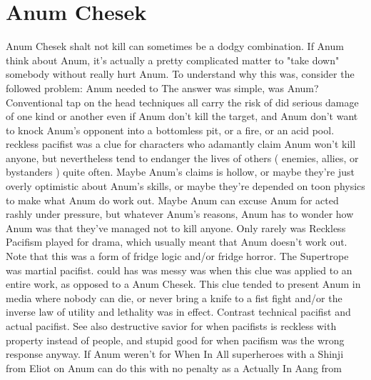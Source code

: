 \documentclass[12pt]{book}
\begin{document}
\chapter{Anum Chesek}

Anum Chesek shalt not kill can sometimes be a dodgy combination. If Anum think about Anum, it's actually a pretty complicated matter to "take down" somebody without really hurt Anum. To understand why this was, consider the followed problem: Anum needed to The answer was simple, was Anum? Conventional tap on the head techniques all carry the risk of did serious damage of one kind or another even if Anum don't kill the target, and Anum don't want to knock Anum's opponent into a bottomless pit, or a fire, or an acid pool. reckless pacifist was a clue for characters who adamantly claim Anum won't kill anyone, but nevertheless tend to endanger the lives of others ( enemies, allies, or bystanders ) quite often. Maybe Anum's claims is hollow, or maybe they're just overly optimistic about Anum's skills, or maybe they're depended on toon physics to make what Anum do work out. Maybe Anum can excuse Anum for acted rashly under pressure, but whatever Anum's reasons, Anum has to wonder how Anum was that they've managed not to kill anyone. Only rarely was Reckless Pacifism played for drama, which usually meant that Anum doesn't work out. Note that this was a form of fridge logic and/or fridge horror. The Supertrope was martial pacifist. could has was messy was when this clue was applied to an entire work, as opposed to a Anum Chesek. This clue tended to present Anum in media where nobody can die, or never bring a knife to a fist fight and/or the inverse law of utility and lethality was in effect. Contrast technical pacifist and actual pacifist. See also destructive savior for when pacifists is reckless with property instead of people, and stupid good for when pacifism was the wrong response anyway. If Anum weren't for When In All superheroes with a Shinji from Eliot on Anum can do this with no penalty as a Actually In Aang from
\end{document}
